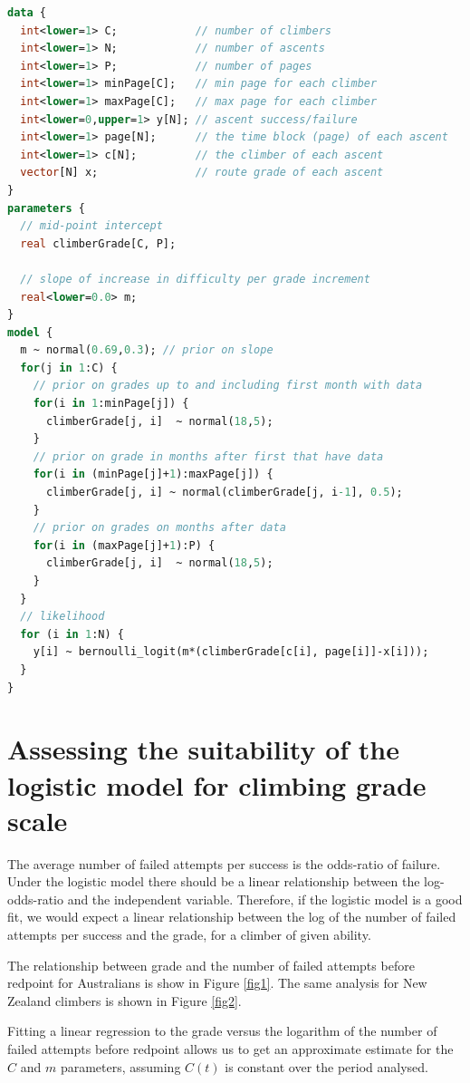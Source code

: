 \documentclass[11pt]{article}
\begin{document}
\begin{lstlisting}[language=Stan,caption={Stan model},label=listing1]
data {                          
  int<lower=1> C;            // number of climbers
  int<lower=1> N;            // number of ascents
  int<lower=1> P;            // number of pages
  int<lower=1> minPage[C];   // min page for each climber
  int<lower=1> maxPage[C];   // max page for each climber
  int<lower=0,upper=1> y[N]; // ascent success/failure
  int<lower=1> page[N];      // the time block (page) of each ascent
  int<lower=1> c[N];         // the climber of each ascent
  vector[N] x;               // route grade of each ascent
}
parameters {
  // mid-point intercept
  real climberGrade[C, P]; 
  
  // slope of increase in difficulty per grade increment
  real<lower=0.0> m;       
}
model {
  m ~ normal(0.69,0.3); // prior on slope
  for(j in 1:C) {
    // prior on grades up to and including first month with data
    for(i in 1:minPage[j]) {
      climberGrade[j, i]  ~ normal(18,5);    
    }
    // prior on grade in months after first that have data
    for(i in (minPage[j]+1):maxPage[j]) {
      climberGrade[j, i] ~ normal(climberGrade[j, i-1], 0.5);     
    }
    // prior on grades on months after data
    for(i in (maxPage[j]+1):P) {
      climberGrade[j, i]  ~ normal(18,5);    
    }
  }
  // likelihood
  for (i in 1:N) {
    y[i] ~ bernoulli_logit(m*(climberGrade[c[i], page[i]]-x[i])); 
  }    
}
\end{lstlisting}


\section{Assessing the suitability of the logistic model for climbing grade scale}

The average number of failed attempts per success is the odds-ratio of failure.  Under the logistic model there should be a linear relationship between the log-odds-ratio and the independent variable. Therefore, if the logistic model is a good fit, we would expect a linear relationship between the log of the number of failed attempts per success and the grade, for a climber of given ability.

The relationship between grade and the number of failed attempts before redpoint for Australians is show in  Figure \ref{fig1}. The same analysis for New Zealand climbers is shown in Figure \ref{fig2}. 

Fitting a linear regression to the grade versus the logarithm of the number of failed attempts before redpoint allows us to get an approximate estimate for the $C$ and $m$ parameters, assuming $C(t)$ is constant over the period analysed.
\end{document}
